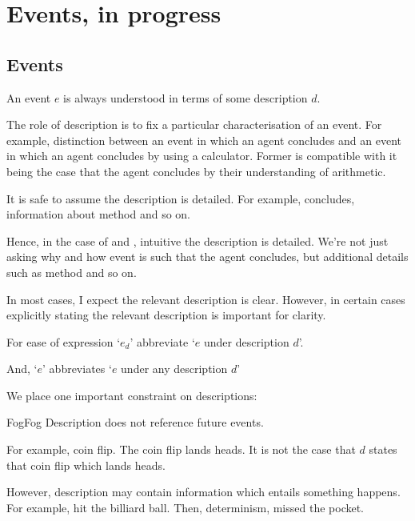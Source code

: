 \chapter{Events, in progress}
\label{cha:events-progress}


\section{Events}
\label{sec:events}


\begin{note}
  \begin{assumption}
    An event \(e\) is always understood in terms of some description \(d\).
  \end{assumption}

  The role of description is to fix a particular characterisation of an event.
  For example, distinction between an event in which an agent concludes and an event in which an agent concludes by using a calculator.
  Former is compatible with it being the case that the agent concludes by their understanding of arithmetic.

  It is safe to assume the description is detailed.
  For example, concludes, information about method and so on.

  {
    \color{red}
    Hence, in the case of \qWhy{} and \qHow{}, intuitive the description is detailed.
    We're not just asking why and how event is such that the agent concludes, but additional details such as method and so on.
  }

  In most cases, I expect the relevant description is clear.
  However, in certain cases explicitly stating the relevant description is important for clarity.

  \begin{notationList}
  \item
    For ease of expression `\(e_{d}\)' abbreviate `\(e\) under description \(d\)'.

    And, `\(e\)' abbreviates `\(e\) under any description \(d\)'
  \end{notationList}
\end{note}


\begin{note}
  We place one important constraint on descriptions:

  \begin{constraint}{Fog}{Fog}
    Description does not reference future events.
  \end{constraint}

  For example, coin flip.
  The coin flip lands heads.
  It is not the case that \(d\) states that coin flip which lands heads.

  However, description may contain information which entails something happens.
  For example, hit the billiard ball.
  Then, determinism, missed the pocket.
\end{note}



